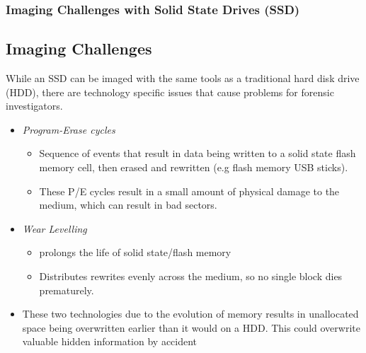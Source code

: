 \documentclass{beamer}
\begin{document}
\begin{frame}
	\frametitle{Imaging Challenges with Solid State Drives (SSD)}
	\subsection*{Imaging Challenges}
	While an SSD can be imaged with the same tools as a traditional hard disk drive (HDD), there are technology specific issues that cause problems for forensic investigators.
	\begin{itemize}
		\item \emph{Program-Erase cycles}
			\begin{itemize}
				\item Sequence of events that result in data being written to a solid state flash memory cell, then erased and rewritten (e.g flash memory USB sticks). 
				\item These P/E cycles result in a small amount of physical damage to the medium, which can result in bad sectors.
			\end{itemize}
		\item \emph{Wear Levelling}
			\begin{itemize}
				\item prolongs the life of solid state/flash memory
				\item Distributes rewrites evenly across the medium, so no single block dies prematurely.
			\end{itemize}
		\item These two technologies due to the evolution of memory results in unallocated space being overwritten earlier than it would on a HDD. This could overwrite valuable hidden information by accident
	\end{itemize}
\end{frame}
\end{document}
